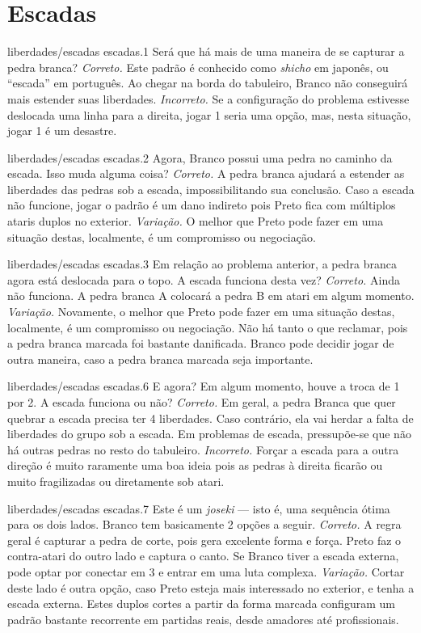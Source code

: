\chapter{Escadas}

\emptypage

\problemAnswerDiagram
  {liberdades/escadas}
  {escadas.1}
  {Será que há mais de uma maneira de se capturar a pedra branca?}
  {\emph{Correto.} Este padrão é conhecido como \emph{shicho} em japonês, ou ``escada'' em português. Ao chegar na borda do tabuleiro, Branco não conseguirá mais estender suas liberdades.}
  {\emph{Incorreto.} Se a configuração do problema estivesse deslocada uma linha para a direita, jogar 1 seria uma opção, mas, nesta situação, jogar 1 é um desastre.}

\problemAnswerDiagram
  {liberdades/escadas}
  {escadas.2}
  {Agora, Branco possui uma pedra no caminho da escada. Isso muda alguma coisa?}
  {\emph{Correto.} A pedra branca ajudará a estender as liberdades das pedras sob a escada, impossibilitando sua conclusão. Caso a escada não funcione, jogar o padrão é um dano indireto pois Preto fica com múltiplos ataris duplos no exterior.}
  {\emph{Variação.} O melhor que Preto pode fazer em uma situação destas, localmente, é um compromisso ou negociação.}

\problemAnswerDiagram
  {liberdades/escadas}
  {escadas.3}
  {Em relação ao problema anterior, a pedra branca agora está deslocada para o topo. A escada funciona desta vez?}
  {\emph{Correto.} Ainda não funciona. A pedra branca A colocará a pedra B em atari em algum momento.}
  {\emph{Variação.} Novamente, o melhor que Preto pode fazer em uma situação destas, localmente, é um compromisso ou negociação. Não há tanto o que reclamar, pois a pedra branca marcada foi bastante danificada. Branco pode decidir jogar de outra maneira, caso a pedra branca marcada seja importante.}

\problemAnswerDiagram
  {liberdades/escadas}
  {escadas.6}
  {E agora? Em algum momento, houve a troca de 1 por 2. A escada funciona ou não?}
  {\emph{Correto.} Em geral, a pedra Branca que quer quebrar a escada precisa ter 4 liberdades. Caso contrário, ela vai herdar a falta de liberdades do grupo sob a escada. Em problemas de escada, pressupõe-se que não há outras pedras no resto do tabuleiro.}
  {\emph{Incorreto.} Forçar a escada para a outra direção é muito raramente uma boa ideia pois as pedras à direita ficarão ou muito fragilizadas ou diretamente sob atari.}

\problemAnswerDiagram
  {liberdades/escadas}
  {escadas.7}
  {Este é um \emph{joseki} --- isto é, uma sequência ótima para os dois lados. Branco tem basicamente 2 opções a seguir.}
  {\emph{Correto.} A regra geral é capturar a pedra de corte, pois gera excelente forma e força. Preto faz o contra-atari do outro lado e captura o canto. Se Branco tiver a escada externa, pode optar por conectar em 3 e entrar em uma luta complexa.}
  {\emph{Variação.} Cortar deste lado é outra opção, caso Preto esteja mais interessado no exterior, e tenha a escada externa. Estes duplos cortes a partir da forma marcada configuram um padrão bastante recorrente em partidas reais, desde amadores até profissionais.}


